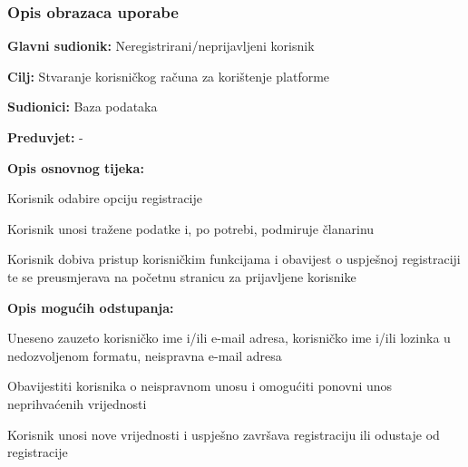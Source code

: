 				\subsubsection{Opis obrazaca uporabe}
						

					\noindent {}
					\begin{packed_item}
	
						\item \textbf{Glavni sudionik:} Neregistrirani/neprijavljeni korisnik
						\item  \textbf{Cilj:} Stvaranje korisničkog računa za korištenje platforme
						\item  \textbf{Sudionici:} Baza podataka
						\item  \textbf{Preduvjet:} -
						\item  \textbf{Opis osnovnog tijeka:}
						
						\item[] \begin{packed_enum}
	
							\item Korisnik odabire opciju registracije
							\item Korisnik unosi tražene podatke i, po potrebi, podmiruje članarinu 
							\item Korisnik dobiva pristup korisničkim funkcijama i obavijest o uspješnoj registraciji te se preusmjerava na početnu stranicu za prijavljene korisnike 
							
						\end{packed_enum}
						
						\item  \textbf{Opis mogućih odstupanja:}
						
						\item[] \begin{packed_item}
							
							\item[2.a] Uneseno zauzeto korisničko ime i/ili e-mail adresa, korisničko ime i/ili lozinka u nedozvoljenom formatu, neispravna e-mail adresa 
							\item[] \begin{packed_enum}
								
								\item Obavijestiti korisnika o neispravnom unosu i omogućiti ponovni unos neprihvaćenih vrijednosti
								\item Korisnik unosi nove vrijednosti i uspješno završava registraciju ili odustaje od registracije 
								
							\end{packed_enum}
						\end{packed_item}
					
					\end{packed_item}
					
